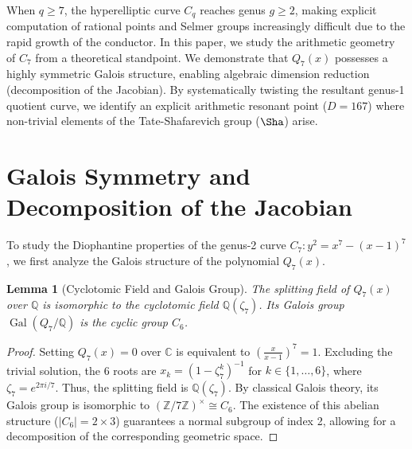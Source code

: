 \documentclass[11pt,a4paper]{article}
\DeclareMathOperator{\Gal}{Gal}
\newtheorem{lemma}[theorem]{Lemma}
\begin{document}
When $q \ge 7$, the hyperelliptic curve $C_q$ reaches genus $g \ge 2$, making explicit computation of rational points and Selmer groups increasingly difficult due to the rapid growth of the conductor. In this paper, we study the arithmetic geometry of $C_7$ from a theoretical standpoint. We demonstrate that $Q_7(x)$ possesses a highly symmetric Galois structure, enabling algebraic dimension reduction (decomposition of the Jacobian). By systematically twisting the resultant genus-1 quotient curve, we identify an explicit arithmetic resonant point ($D=167$) where non-trivial elements of the Tate-Shafarevich group ($\Sha$) arise.

\section{Galois Symmetry and Decomposition of the Jacobian}

To study the Diophantine properties of the genus-2 curve $C_7: y^2 = x^7 - (x-1)^7$, we first analyze the Galois structure of the polynomial $Q_7(x)$.

\begin{lemma}[Cyclotomic Field and Galois Group]
The splitting field of $Q_7(x)$ over $\mathbb{Q}$ is isomorphic to the cyclotomic field $\mathbb{Q}(\zeta_7)$. Its Galois group $\Gal(Q_7/\mathbb{Q})$ is the cyclic group $C_6$.
\end{lemma}
\begin{proof}
Setting $Q_7(x) = 0$ over $\mathbb{C}$ is equivalent to $(\frac{x}{x-1})^7 = 1$. Excluding the trivial solution, the 6 roots are $x_k = (1 - \zeta_7^k)^{-1}$ for $k \in \{1, \dots, 6\}$, where $\zeta_7 = e^{2\pi i / 7}$. Thus, the splitting field is $\mathbb{Q}(\zeta_7)$. By classical Galois theory, its Galois group is isomorphic to $(\mathbb{Z}/7\mathbb{Z})^\times \cong C_6$. The existence of this abelian structure ($|C_6| = 2 \times 3$) guarantees a normal subgroup of index 2, allowing for a decomposition of the corresponding geometric space.
\end{proof}
\end{document}

